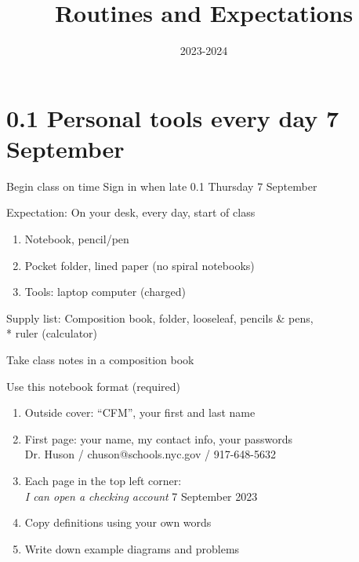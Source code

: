 \documentclass[onlytextwidth]{beamer}
\title{Routines and Expectations}
\date{2023-2024}
\begin{document}
\frame{\titlepage}


\section{0.1 Personal tools every day \hfill 7 September}
\begin{frame}{Begin class on time}
  {Sign in when late \hfill \alert{0.1 Thursday 7 September}}
  \begin{block}{Expectation: On your desk, every day, start of class}
  \begin{enumerate}
      \item Notebook, pencil/pen
      \item Pocket folder, lined paper (no spiral notebooks)
      \item Tools: laptop computer (charged)
  \end{enumerate}
  \end{block}
  Supply list: Composition book, folder, looseleaf, pencils \& pens, \\*
  ruler (calculator)
  \end{frame}

\begin{frame}{Take class notes in a composition book}
  \begin{block}{Use this notebook format (required)}
    \begin{enumerate}
      \item Outside cover: ``CFM'', your first and last name
      \item First page: your name, my contact info, your passwords \\
      \qquad Dr. Huson / chuson@schools.nyc.gov / 917-648-5632 \vspace{0.25cm}
      \item Each page in the top left corner: \\
      \emph{I can open a checking account} \hfill 7 September 2023 \vspace{0.25cm}
      \item Copy definitions using your own words
      \item Write down example diagrams and problems
    \end{enumerate}
    \end{block}
  \end{frame}
\end{document}
